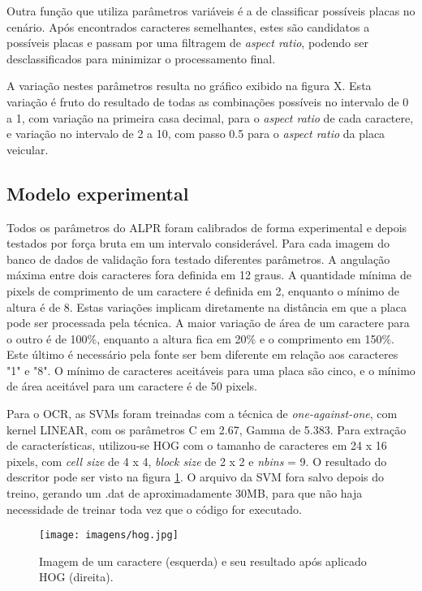 Outra função que utiliza parâmetros variáveis é a de classificar possíveis placas no cenário. Após encontrados caracteres semelhantes, estes são candidatos a possíveis placas e passam por uma filtragem de \textit{aspect ratio}, podendo ser desclassificados para minimizar o processamento final.

A variação nestes parâmetros resulta no gráfico exibido na figura X. Esta variação é fruto do resultado de todas as combinações possíveis no intervalo de 0 a 1, com variação na primeira casa decimal, para o \textit{aspect ratio} de cada caractere, e variação no intervalo de 2 a 10, com passo 0.5 para o \textit{aspect ratio} da placa veicular.

\subsection{Modelo experimental}

Todos os parâmetros do ALPR foram calibrados de forma experimental e depois testados por força bruta em um intervalo considerável. Para cada imagem do banco de dados de validação fora testado diferentes parâmetros. A angulação máxima entre dois caracteres fora definida em 12 graus. A quantidade mínima de pixels de comprimento de um caractere é definida em 2, enquanto o mínimo de altura é de 8. Estas variações implicam diretamente na distância em que a placa pode ser processada pela técnica. A maior variação de área de um caractere para o outro é de 100\%, enquanto a altura fica em 20\% e o comprimento em 150\%. Este último é necessário pela fonte ser bem diferente em relação aos caracteres "1" e "8". O mínimo de caracteres aceitáveis para uma placa são cinco, e o mínimo de área aceitável para um caractere é de 50 pixels.

Para o OCR, as SVMs foram treinadas com a técnica de \textit{one-against-one}, com kernel LINEAR, com os parâmetros C em 2.67, Gamma de 5.383. Para extração de características, utilizou-se HOG com o tamanho de caracteres em 24 x 16 pixels, com \textit{cell size} de 4 x 4, \textit{block size} de 2 x 2 e \textit{nbins} = 9. O resultado do descritor pode ser visto na figura \ref{fig:hog}. O arquivo da SVM fora salvo depois do treino, gerando um .dat de aproximadamente 30MB, para que não haja necessidade de treinar toda vez que o código for executado.

\begin{figure}[!htb]
\centering
\texttt{[image: imagens/hog.jpg]}
\caption{Imagem de um caractere (esquerda) e seu resultado após aplicado HOG (direita).}
\label{fig:hog}
\end{figure}

